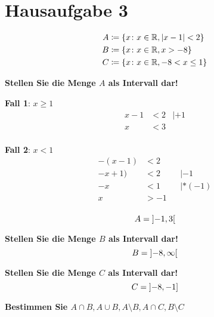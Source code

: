 \documentclass{article}
\begin{document}
\section*{Hausaufgabe 3}

\begin{align*}
  A &\coloneqq \{ x \colon x \in \mathbb{R}, \abs{x - 1} < 2 \} \\
  B &\coloneqq \{ x \colon x \in \mathbb{R}, x > -8 \} \\
  C &\coloneqq \{ x \colon x \in \mathbb{R}, -8 <x \leq 1 \} \\
\end{align*}

\textbf{Stellen Sie die Menge $A$ als Intervall dar!} \\

\begin{minipage}[t]{.45\textwidth}
  \textbf{Fall 1}: $x \geq 1$ \\
  \begin{align*}
    x - 1 &< 2 & | +1\\
    x &< 3 \\
  \end{align*}
\end{minipage}
\hfill
\vrule
\hfill
\begin{minipage}[t]{.45\textwidth}
  \textbf{Fall 2}: $x < 1$ \\
  \begin{align*}
    -(x - 1) &< 2 \\
    -x + 1) &< 2 &&| -1 \\
    -x &< 1 &&| * (-1) \\
    x &> -1 \\
  \end{align*}
\end{minipage}

\[
  A = \interval[open]{-1}{3}
\]

\textbf{Stellen Sie die Menge $B$ als Intervall dar!} \\

\[
  B = \interval[open]{-8}{\infty}
\]

\textbf{Stellen Sie die Menge $C$ als Intervall dar!} \\

\[
  C = \interval[open left]{-8}{-1}
\]

\textbf{Bestimmen Sie $A \cap B, A \cup B, A \setminus B, A \cap C, B \setminus C$}
\end{document}
